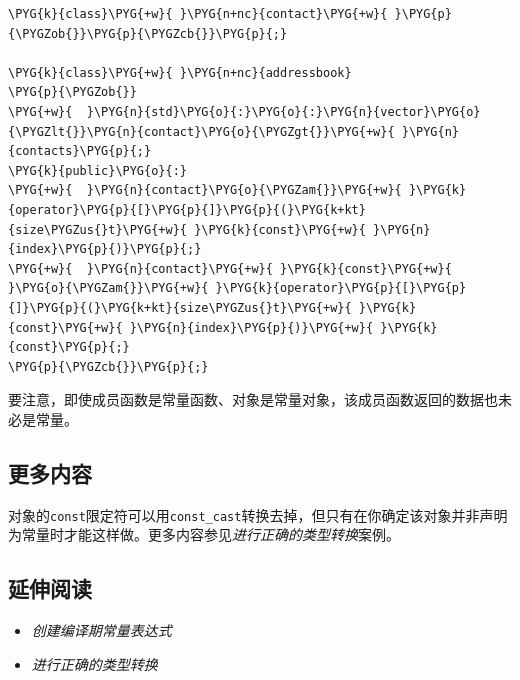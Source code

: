 
\begin{codeblockbg}
\begin{Verbatim}[commandchars=\\\{\},breaklines=true,breakanywhere=true,fontsize=\codefont,xleftmargin=17bp]
\PYG{k}{class}\PYG{+w}{ }\PYG{n+nc}{contact}\PYG{+w}{ }\PYG{p}{\PYGZob{}}\PYG{p}{\PYGZcb{}}\PYG{p}{;}

\PYG{k}{class}\PYG{+w}{ }\PYG{n+nc}{addressbook}
\PYG{p}{\PYGZob{}}
\PYG{+w}{  }\PYG{n}{std}\PYG{o}{:}\PYG{o}{:}\PYG{n}{vector}\PYG{o}{\PYGZlt{}}\PYG{n}{contact}\PYG{o}{\PYGZgt{}}\PYG{+w}{ }\PYG{n}{contacts}\PYG{p}{;}
\PYG{k}{public}\PYG{o}{:}
\PYG{+w}{  }\PYG{n}{contact}\PYG{o}{\PYGZam{}}\PYG{+w}{ }\PYG{k}{operator}\PYG{p}{[}\PYG{p}{]}\PYG{p}{(}\PYG{k+kt}{size\PYGZus{}t}\PYG{+w}{ }\PYG{k}{const}\PYG{+w}{ }\PYG{n}{index}\PYG{p}{)}\PYG{p}{;}
\PYG{+w}{  }\PYG{n}{contact}\PYG{+w}{ }\PYG{k}{const}\PYG{+w}{ }\PYG{o}{\PYGZam{}}\PYG{+w}{ }\PYG{k}{operator}\PYG{p}{[}\PYG{p}{]}\PYG{p}{(}\PYG{k+kt}{size\PYGZus{}t}\PYG{+w}{ }\PYG{k}{const}\PYG{+w}{ }\PYG{n}{index}\PYG{p}{)}\PYG{+w}{ }\PYG{k}{const}\PYG{p}{;}
\PYG{p}{\PYGZcb{}}\PYG{p}{;}
\end{Verbatim}
\end{codeblockbg}



\begin{myNote}
要注意，即使成员函数是常量函数、对象是常量对象，该成员函数返回的数据也未必是常量。
\end{myNote}



\subsection{更多内容}



对象的\texttt{const}限定符可以用\texttt{const\_\allowbreak{}cast}转换去掉，但只有在你确定该对象并非声明为常量时才能这样做。更多内容参见\textit{进行正确的类型转换}案例。



\subsection{延伸阅读}



\begin{itemize}
\item \textit{创建编译期常量表达式}



\item \textit{进行正确的类型转换}

\end{itemize}


